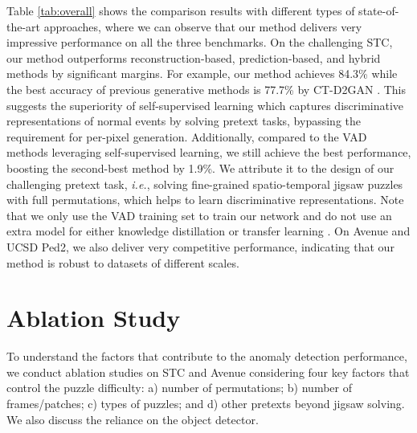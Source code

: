 \documentclass[runningheads]{llncs}
\begin{document}
Table \ref{tab:overall} shows the comparison results with different types of state-of-the-art approaches, where we can observe that our method delivers very impressive performance on all the three benchmarks. On the challenging STC, our method outperforms reconstruction-based, prediction-based, and hybrid methods by significant margins. For example, our method achieves 84.3\% while the best accuracy of previous generative methods is 77.7\% by CT-D2GAN \cite{feng2021Conv}. This suggests the superiority of self-supervised learning which captures discriminative representations of normal events by solving pretext tasks, bypassing the requirement for per-pixel generation. Additionally, compared to the VAD methods \cite{georgescu2021anomaly, wang2020cluster} leveraging self-supervised learning, we still achieve the best performance, boosting the second-best method \cite{georgescu2021anomaly} by 1.9\%. We attribute it to the design of our challenging pretext task, \emph{i.e.}, solving fine-grained spatio-temporal jigsaw puzzles with full permutations, which helps to learn discriminative representations. Note that we only use the VAD training set to train our network and do not use an extra model for either knowledge distillation \cite{georgescu2021anomaly} or transfer learning \cite{wang2020cluster}. On Avenue and UCSD Ped2, we also deliver very competitive performance, indicating that our method is robust to datasets of different scales. 


\section{Ablation Study}


To understand the factors that contribute to the anomaly detection performance, we conduct ablation studies on STC and Avenue considering four key factors that control the puzzle difficulty: a) number of permutations; b) number of frames/patches; c) types of puzzles; and d) other pretexts beyond jigsaw solving. We also discuss the reliance on the object detector.
\end{document}
